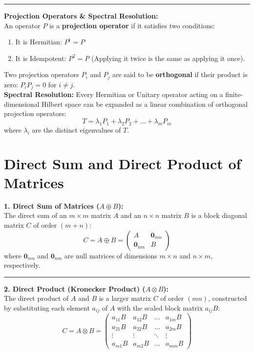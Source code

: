 \documentclass[11pt, a4paper]{report}
\begin{document}
\vspace{1em}
\hrule
\vspace{1em}

\textbf{Projection Operators \& Spectral Resolution:}\\
An operator $P$ is a \textbf{projection operator} if it satisfies two conditions:
\begin{enumerate}
    \item It is Hermitian: $P^\dagger = P$
    \item It is Idempotent: $P^2 = P$ (Applying it twice is the same as applying it once).
\end{enumerate}
Two projection operators $P_i$ and $P_j$ are said to be \textbf{orthogonal} if their product is zero: $P_i P_j = 0$ for $i \neq j$. \\

\textbf{Spectral Resolution:} Every Hermitian or Unitary operator acting on a finite-dimensional Hilbert space can be expanded as a linear combination of orthogonal projection operators:
\[ T = \lambda_1 P_1 + \lambda_2 P_2 + \dots + \lambda_m P_m \]
where $\lambda_i$ are the distinct eigenvalues of $T$.

\section{Direct Sum and Direct Product of Matrices}

\textbf{1. Direct Sum of Matrices ($A \oplus B$):}\\
The direct sum of an $m \times m$ matrix $A$ and an $n \times n$ matrix $B$ is a block diagonal matrix $C$ of order $(m+n)$:
\[ C = A \oplus B = \begin{pmatrix} A & \mathbf{0}_{mn} \\ \mathbf{0}_{nm} & B \end{pmatrix} \]
where $\mathbf{0}_{mn}$ and $\mathbf{0}_{nm}$ are null matrices of dimensions $m \times n$ and $n \times m$, respectively.

\vspace{1em}
\hrule
\vspace{1em}

\textbf{2. Direct Product (Kronecker Product) ($A \otimes B$):}\\
The direct product of $A$ and $B$ is a larger matrix $C$ of order $(mn)$, constructed by substituting each element $a_{ij}$ of $A$ with the scaled block matrix $a_{ij}B$:
\[ C = A \otimes B = \begin{pmatrix} a_{11}B & a_{12}B & \dots & a_{1m}B \\ a_{21}B & a_{22}B & \dots & a_{2m}B \\ \vdots & \vdots & \ddots & \vdots \\ a_{m1}B & a_{m2}B & \dots & a_{mm}B \end{pmatrix} \]
\end{document}

